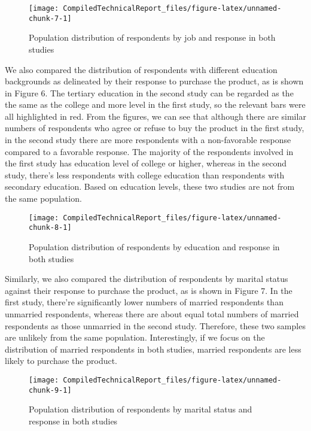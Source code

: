 \documentclass[]{article}
\begin{document}
\begin{figure}[h!]

{\centering \texttt{[image: CompiledTechnicalReport\_files/figure-latex/unnamed-chunk-7-1]} 

}

\caption{Population distribution of respondents by job and response in both studies}\label{fig:unnamed-chunk-7}
\end{figure}

\newpage

We also compared the distribution of respondents with different
education backgrounds as delineated by their response to purchase the
product, as is shown in Figure 6. The tertiary education in the second
study can be regarded as the the same as the college and more level in
the first study, so the relevant bars were all highlighted in red. From
the figures, we can see that although there are similar numbers of
respondents who agree or refuse to buy the product in the first study,
in the second study there are more respondents with a non-favorable
response compared to a favorable response. The majority of the
respondents involved in the first study has education level of college
or higher, whereas in the second study, there's less respondents with
college education than respondents with secondary education. Based on
education levels, these two studies are not from the same population.

\begin{figure}[h!]

{\centering \texttt{[image: CompiledTechnicalReport\_files/figure-latex/unnamed-chunk-8-1]} 

}

\caption{Population distribution of respondents by education and response in both studies}\label{fig:unnamed-chunk-8}
\end{figure}

Similarly, we also compared the distribution of respondents by marital
status against their response to purchase the product, as is shown in
Figure 7. In the first study, there're significantly lower numbers of
married respondents than unmarried respondents, whereas there are about
equal total numbers of married respondents as those unmarried in the
second study. Therefore, these two samples are unlikely from the same
population. Interestingly, if we focus on the distribution of married
respondents in both studies, married respondents are less likely to
purchase the product.

\begin{figure}

{\centering \texttt{[image: CompiledTechnicalReport\_files/figure-latex/unnamed-chunk-9-1]} 

}

\caption{Population distribution of respondents by marital status and response in both studies}\label{fig:unnamed-chunk-9}
\end{figure}
\end{document}
